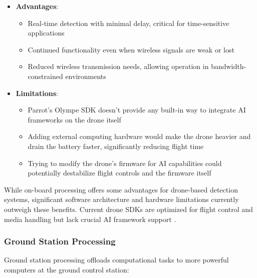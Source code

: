 \begin{itemize}
    \item \textbf{Advantages}:
    \begin{itemize}
        \item Real-time detection with minimal delay, critical for time-sensitive applications \cite{Tijtgat2017}
        \item Continued functionality even when wireless signals are weak or lost \cite{Mittal2019}
        \item Reduced wireless transmission needs, allowing operation in bandwidth-constrained environments \cite{Yanmaz2018}
    \end{itemize}
    
    \item \textbf{Limitations}:
    \begin{itemize}
        \item Parrot's Olympe SDK doesn't provide any built-in way to integrate AI frameworks on the drone itself \cite{ParrotOlympeDoc}
        \item Adding external computing hardware would make the drone heavier and drain the battery faster, significantly reducing flight time \cite{Mittal2019}
        \item Trying to modify the drone's firmware for AI capabilities could potentially destabilize flight controls and the firmware itself \cite{Tijtgat2017}
    \end{itemize}
\end{itemize}

While on-board processing offers some advantages for drone-based detection systems, significant software architecture and hardware limitations currently outweigh these benefits. Current drone SDKs are optimized for flight control and media handling but lack crucial AI framework support \cite{ParrotOlympeDoc, Pelliccione2020}.

\subsubsection{Ground Station Processing}

Ground station processing offloads computational tasks to more powerful computers at the ground control station:


